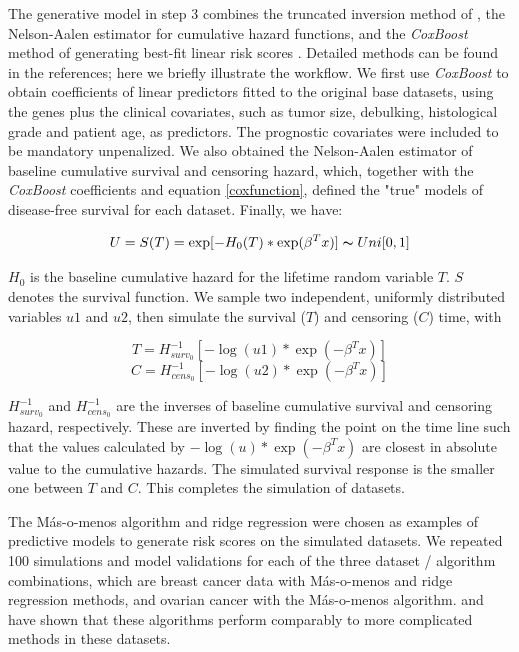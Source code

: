 \documentclass{bioinfo}
\begin{document}
    The generative model in step 3 combines the truncated inversion
    method of \citet{Bender2005}, the Nelson-Aalen estimator
    \citep{Nelson1969,Nelson1972,Aalen1978}
    for cumulative hazard functions, and the \emph{CoxBoost} method of
    generating best-fit linear risk scores
    \citep{Binder2008}. Detailed methods can be found in the references;
    here we briefly illustrate the workflow. We first
    use \emph{CoxBoost} to obtain coefficients of linear predictors
    fitted to the original base datasets, using the genes plus the 
    clinical covariates, such as
    tumor size, debulking, histological grade and patient age, as predictors.
    The prognostic covariates were included to be mandatory unpenalized.
    We also obtained the Nelson-Aalen estimator of baseline cumulative survival and
    censoring hazard, which, together with the \emph{CoxBoost}
    coefficients and equation \ref{coxfunction}, defined the "true"
    models of disease-free survival for each dataset.  Finally, we have:

    \begin{equation}\label{uniformrv}
      U = S(T) = \exp[-H_{0}(T) * \exp(\beta^{T}x)] \thicksim Uni[0,1]
    \end{equation}

    $H_{0}$ is the baseline cumulative hazard for the lifetime random variable $T$. $S$ denotes the survival function. We sample two independent, uniformly distributed
    variables $u1$ and $u2$, then simulate the survival ($T$) and censoring ($C$)
    time, with

    \begin{equation}\label{survivaltime}
      T = H_{surv_{0}}^{-1} [ - \log(u1) * \exp(-\beta^{T}x)]
    \end{equation}
    \begin{equation}\label{censoringtime}
      C = H_{cens_{0}}^{-1} [ - \log(u2) * \exp(-\beta^{T}x)]
    \end{equation}

    $H_{surv_{0}}^{-1}$ and $H_{cens_{0}}^{-1}$ are the inverses
    of baseline cumulative survival and censoring hazard, respectively.  These
    are inverted by finding
    the point on the time line such that the values calculated by
    $- \log(u) * \exp(- \beta^{T}x)$ are closest in absolute value to the
    cumulative hazards. The simulated survival response is the smaller one between
    $T$ and $C$. This completes the simulation of datasets.

	The M\'{a}s-o-menos algorithm \citep{Zhao2014, donoho2008higher} and ridge 
	regression \citep{hoerl1970ridge} were chosen as
    examples of predictive models to generate risk scores on the simulated datasets. 
    We repeated 100 simulations and model validations 
    for each of the three dataset / algorithm combinations, 
    which are breast cancer data with M\'{a}s-o-menos and ridge regression methods, 
    and ovarian cancer with the M\'{a}s-o-menos
    algorithm. \citet{Bernau2014} and \citet{Zhao2014} have shown that these algorithms
    perform comparably to more complicated methods in these datasets.
    
\end{document}
